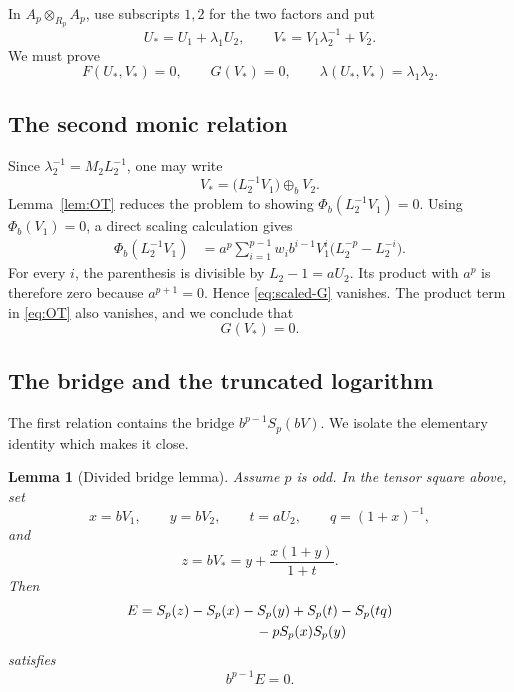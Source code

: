 \documentclass[11pt]{amsart}
\newtheorem{lemma}[theorem]{Lemma}
\theoremstyle{definition}
\theoremstyle{remark}
\newcommand{\ot}{\otimes}
\begin{document}
In \(A_p\ot_{R_p}A_p\), use subscripts \(1,2\) for the two factors and
put
\begin{equation}\label{eq:star}
 U_*=U_1+\lambda_1U_2,
 \qquad
 V_*=V_1\lambda_2^{-1}+V_2.
\end{equation}
We must prove
\begin{equation}\label{eq:three-closure}
 F(U_*,V_*)=0,
 \qquad G(V_*)=0,
 \qquad \lambda(U_*,V_*)=\lambda_1\lambda_2.
\end{equation}

\subsection{The second monic relation}

Since \(\lambda_2^{-1}=M_2L_2^{-1}\), one may write
\begin{equation}\label{eq:Vstar-formal}
 V_*=\bigl(L_2^{-1}V_1\bigr)\oplus_bV_2.
\end{equation}
Lemma~\ref{lem:OT} reduces the problem to showing
\(\Phi_b(L_2^{-1}V_1)=0\).  Using \(\Phi_b(V_1)=0\), a direct scaling
calculation gives
\begin{align}
 \Phi_b(L_2^{-1}V_1)
 &=a^p\sum_{i=1}^{p-1}w_i b^{i-1}V_1^i
   \bigl(L_2^{-p}-L_2^{-i}\bigr).\label{eq:scaled-G}
\end{align}
For every \(i\), the parenthesis is divisible by
\(L_2-1=aU_2\).  Its product with \(a^p\) is therefore zero because
\(a^{p+1}=0\).  Hence \eqref{eq:scaled-G} vanishes.  The product term
in \eqref{eq:OT} also vanishes, and we conclude that
\begin{equation}\label{eq:G-closes}
 G(V_*)=0.
\end{equation}

\subsection{The bridge and the truncated logarithm}

The first relation contains the bridge
\(b^{p-1}S_p(bV)\).  We isolate the elementary identity which makes it
close.

\begin{lemma}[Divided bridge lemma]\label{lem:bridge}
Assume \(p\) is odd.  In the tensor square above, set
\[
 x=bV_1,\qquad y=bV_2,\qquad t=aU_2,
 \qquad q=(1+x)^{-1},
\]
and
\begin{equation}\label{eq:z}
 z=bV_*=y+\frac{x(1+y)}{1+t}.
\end{equation}
Then
\begin{equation}\label{eq:E}
 \begin{split}
 E={}&S_p(z)-S_p(x)-S_p(y)
       +S_p(t)-S_p(tq)\\
    &\hspace{25mm}-pS_p(x)S_p(y)
 \end{split}
\end{equation}
satisfies
\begin{equation}\label{eq:bridge-vanish}
 b^{p-1}E=0.
\end{equation}
\end{lemma}
\end{document}

